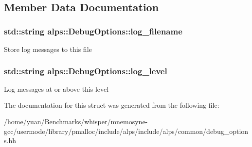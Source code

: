 \subsection{Member Data Documentation}
\subsubsection[{\texorpdfstring{log\+\_\+filename}{log_filename}}]{\setlength{\rightskip}{0pt plus 5cm}std\+::string alps\+::\+Debug\+Options\+::log\+\_\+filename}\hypertarget{structalps_1_1DebugOptions_a777ede2e77a0fed168bdcfe8ebe19465}{}\label{structalps_1_1DebugOptions_a777ede2e77a0fed168bdcfe8ebe19465}
Store log messages to this file 
\subsubsection[{\texorpdfstring{log\+\_\+level}{log_level}}]{\setlength{\rightskip}{0pt plus 5cm}std\+::string alps\+::\+Debug\+Options\+::log\+\_\+level}\hypertarget{structalps_1_1DebugOptions_a6c5c875c884d1580128aa0c095dcf5dd}{}\label{structalps_1_1DebugOptions_a6c5c875c884d1580128aa0c095dcf5dd}
Log messages at or above this level 

The documentation for this struct was generated from the following file\+:\begin{DoxyCompactItemize}
\item 
/home/yuan/\+Benchmarks/whisper/mnemosyne-\/gcc/usermode/library/pmalloc/include/alps/include/alps/common/debug\+\_\+options.\+hh\end{DoxyCompactItemize}
